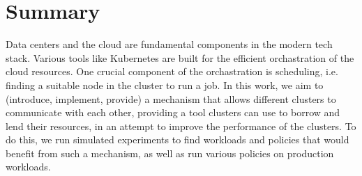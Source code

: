 \section{Summary}
Data centers and the cloud are fundamental components in the modern tech stack. 
Various tools like Kubernetes are built for the efficient orchastration of the cloud resources.
One crucial component of the orchastration is scheduling, i.e. finding a suitable node in the cluster 
to run a job. In this work, we aim to (introduce, implement, provide) a mechanism that allows different clusters to communicate 
with each other, providing a tool clusters can use to borrow and lend their resources, in an attempt to improve 
the performance of the clusters. To do this, we run simulated experiments to find workloads and policies that 
would benefit from such a mechanism, as well as run various policies on production workloads.

